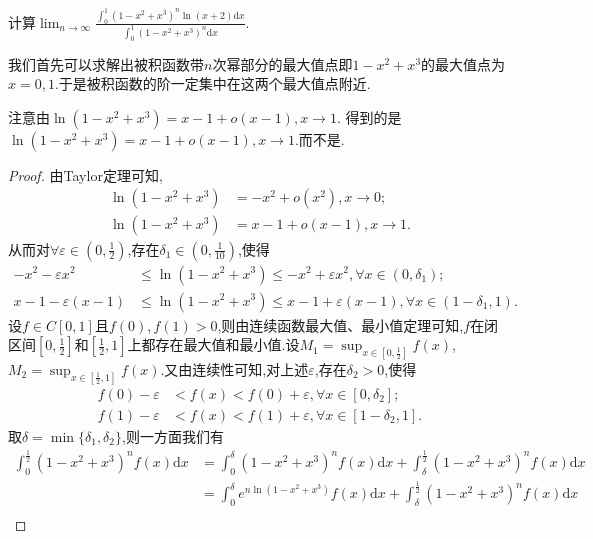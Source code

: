 \documentclass[../../main.tex]{subfiles}
\begin{document}
\begin{example}\label{Laplace方法例题4}
计算$\lim_{n\rightarrow \infty} \frac{\int_0^1{\left( 1-x^2+x^3 \right) ^n\ln \left( x+2 \right) \mathrm{d}x}}{\int_0^1{\left( 1-x^2+x^3 \right) ^n\mathrm{d}x}}.$
\end{example}
\begin{note}
我们首先可以求解出被积函数带$n$次幂部分的最大值点即$1-x^2+x^3$的最大值点为$x=0,1$.于是被积函数的阶一定集中在这两个最大值点附近.
\end{note}
\begin{remark}
注意由$\ln(1 - x^2 + x^3) = x - 1 + o(x - 1),  x\rightarrow 1$.
得到的是$\ln(1 - x^2 + x^3) = x - 1 + o(x - 1),  x\rightarrow 1$.而不是.
\end{remark}
\begin{proof}
由Taylor定理可知,
\begin{align*}
\ln(1 - x^2 + x^3) &= -x^2 + o(x^2),  x\rightarrow 0;\\
\ln(1 - x^2 + x^3) &= x - 1 + o(x - 1),  x\rightarrow 1.
\end{align*}
从而对\(\forall \varepsilon \in (0,\frac{1}{2})\),存在\(\delta_1 \in (0,\frac{1}{10})\),使得
\begin{align*}
-x^2 - \varepsilon x^2&\leqslant\ln(1 - x^2 + x^3)\leqslant -x^2 + \varepsilon x^2, \forall x\in (0,\delta_1);\\
x - 1 - \varepsilon(x - 1)&\leqslant\ln(1 - x^2 + x^3)\leqslant x - 1 + \varepsilon(x - 1), \forall x\in (1 - \delta_1,1).
\end{align*}
设\(f\in C[0,1]\)且$f(0),f(1)>0$,则由连续函数最大值、最小值定理可知,\(f\)在闭区间\([0,\frac{1}{2}]\)和$[\frac{1}{2},1]$上都存在最大值和最小值.设\(M_1 = \sup_{x\in [0,\frac{1}{2}]}f(x)\),\(M_2 = \sup_{x\in [\frac{1}{2},1]}f(x)\).又由连续性可知,对上述\(\varepsilon\),存在\(\delta_2>0\),使得
\begin{align*}
f(0) - \varepsilon&< f(x) < f(0) + \varepsilon, \forall x\in [0,\delta_2];\\
f(1) - \varepsilon&< f(x) < f(1) + \varepsilon, \forall x\in [1 - \delta_2,1].
\end{align*}
取\(\delta = \min\{\delta_1,\delta_2\}\),则一方面我们有
\begin{align*}
\int_0^{\frac{1}{2}}{(1 - x^2 + x^3)^nf(x)\mathrm{d}x}&=\int_0^{\delta}{(1 - x^2 + x^3)^nf(x)\mathrm{d}x}+\int_{\delta}^{\frac{1}{2}}{(1 - x^2 + x^3)^nf(x)\mathrm{d}x}\\
&=\int_0^{\delta}{e^{n\ln(1 - x^2 + x^3)}f(x)\mathrm{d}x}+\int_{\delta}^{\frac{1}{2}}{(1 - x^2 + x^3)^nf(x)\mathrm{d}x}\\

\end{align*}
\end{proof}
\end{document}
